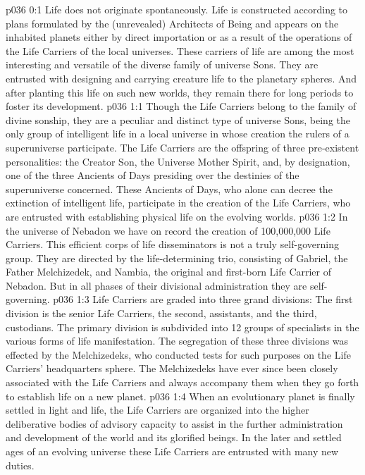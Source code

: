 \author{Vorondadek Son}
\vs p036 0:1 Life does not originate spontaneously. Life is constructed according to plans formulated by the (unrevealed) Architects of Being and appears on the inhabited planets either by direct importation or as a result of the operations of the Life Carriers of the local universes. These carriers of life are among the most interesting and versatile of the diverse family of universe Sons. They are entrusted with designing and carrying creature life to the planetary spheres. And after planting this life on such new worlds, they remain there for long periods to foster its development.
\vs p036 1:1 Though the Life Carriers belong to the family of divine sonship, they are a peculiar and distinct type of universe Sons, being the only group of intelligent life in a local universe in whose creation the rulers of a superuniverse participate. The Life Carriers are the offspring of three pre\hyp{}existent personalities: the Creator Son, the Universe Mother Spirit, and, by designation, one of the three Ancients of Days presiding over the destinies of the superuniverse concerned. These Ancients of Days, who alone can decree the extinction of intelligent life, participate in the creation of the Life Carriers, who are entrusted with establishing physical life on the evolving worlds.
\vs p036 1:2 In the universe of Nebadon we have on record the creation of 100,000,000 Life Carriers. This efficient corps of life disseminators is not a truly self\hyp{}governing group. They are directed by the life\hyp{}determining trio, consisting of Gabriel, the Father Melchizedek, and Nambia, the original and first\hyp{}born Life Carrier of Nebadon. But in all phases of their divisional administration they are self\hyp{}governing.
\vs p036 1:3 Life Carriers are graded into three grand divisions: The first division is the senior Life Carriers, the second, assistants, and the third, custodians. The primary division is subdivided into 12 groups of specialists in the various forms of life manifestation. The segregation of these three divisions was effected by the Melchizedeks, who conducted tests for such purposes on the Life Carriers’ headquarters sphere. The Melchizedeks have ever since been closely associated with the Life Carriers and always accompany them when they go forth to establish life on a new planet.
\vs p036 1:4 When an evolutionary planet is finally settled in light and life, the Life Carriers are organized into the higher deliberative bodies of advisory capacity to assist in the further administration and development of the world and its glorified beings. In the later and settled ages of an evolving universe these Life Carriers are entrusted with many new duties.
